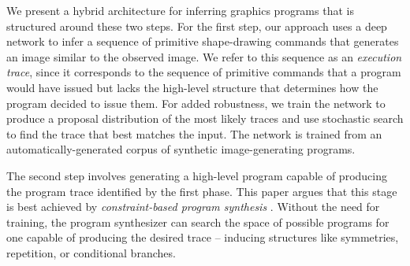 \documentclass{article}
\begin{document}
We present a hybrid architecture for inferring graphics programs that is structured around these two steps. For the first step, our approach uses a deep network to infer a sequence of primitive shape-drawing commands that generates an image similar to the observed image. We refer to this sequence as an \emph{execution trace}, since it corresponds to the sequence of primitive commands that a program would have issued but lacks the high-level structure that determines how the program decided to issue them. For added robustness, we train the network to produce a proposal distribution of the most likely traces and use stochastic search to find the trace that best matches the input. The network is trained from an automatically-generated corpus of synthetic image-generating programs.

The second step involves generating a high-level program capable of producing the program trace identified by the first phase.
This paper argues that this stage is best achieved by \emph{constraint-based program synthesis} \cite{solar2008program}. Without the need for training, the program synthesizer can search the space of possible programs for one capable of producing the desired trace -- inducing structures like
symmetries, repetition, or conditional branches.

\end{document}
